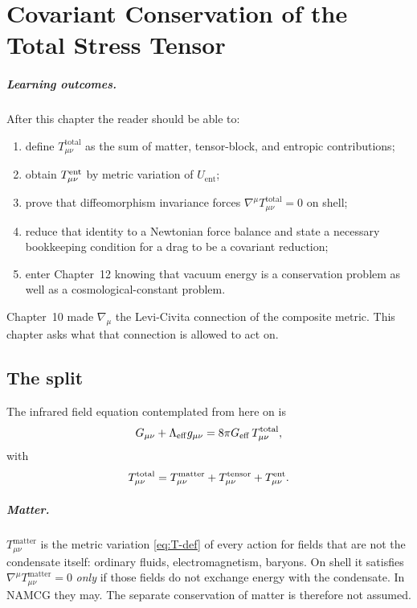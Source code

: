 \chapter[Conservation]{Covariant Conservation of the Total Stress Tensor}
\label{ch:conservation}

\paragraph{Learning outcomes.}
After this chapter the reader should be able to:
\begin{enumerate}
  \item define \(T_{\mu\nu}^{\mathrm{total}}\) as the sum of matter,
        tensor-block, and entropic contributions;
  \item obtain \(T^{\mathrm{ent}}_{\mu\nu}\) by metric variation of
        \(U_{\mathrm{ent}}\);
  \item prove that diffeomorphism invariance forces
        \(\nabla^\mu T_{\mu\nu}^{\mathrm{total}}=0\) on shell;
  \item reduce that identity to a Newtonian force balance and state
        a necessary bookkeeping condition for a drag to be a
        covariant reduction;
  \item enter Chapter~12 knowing that vacuum energy is a
        conservation problem as well as a cosmological-constant
        problem.
\end{enumerate}

Chapter~10 made \(\nabla_\mu\) the Levi-Civita connection of the
composite metric. This chapter asks what that connection is allowed
to act on.

\section{The split}
\label{sec:ch11-split}

The infrared field equation contemplated from here on is
\begin{equation}
  \label{eq:EFE-total}
  G_{\mu\nu}+\Lambda_{\mathrm{eff}}g_{\mu\nu}
  =8\pi G_{\mathrm{eff}}\,T_{\mu\nu}^{\mathrm{total}},
\end{equation}
with
\begin{equation}
  \label{eq:T-total-def}
  T_{\mu\nu}^{\mathrm{total}}
  =T_{\mu\nu}^{\mathrm{matter}}
  +T_{\mu\nu}^{\mathrm{tensor}}
  +T^{\mathrm{ent}}_{\mu\nu}.
\end{equation}

\paragraph{Matter.}
\(T_{\mu\nu}^{\mathrm{matter}}\) is the metric variation
\eqref{eq:T-def} of every action for fields that are not the
condensate itself: ordinary fluids, electromagnetism, baryons. On
shell it satisfies \(\nabla^\mu T_{\mu\nu}^{\mathrm{matter}}=0\)
\emph{only} if those fields do not exchange energy with the
condensate. In NAMCG they may. The separate conservation of matter
is therefore not assumed.

